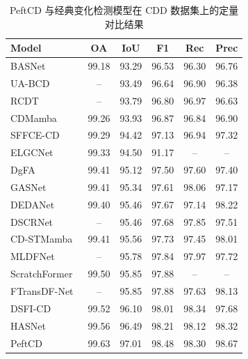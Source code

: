 \begin{table}[!htbp]
\centering
\caption{PeftCD 与经典变化检测模型在 CDD 数据集上的定量对比结果}
\label{tab:peftcd_cdd}
\begin{tabular}{l c c c c c}
\toprule
\textbf{Model} & \textbf{OA} & \textbf{IoU} & \textbf{F1} & \textbf{Rec} & \textbf{Prec} \\
\midrule
BASNet~\cite{z_wang_bitemporal_2024} & 99.18 & 93.29 & 96.53 & 96.30 & 96.76 \\  
UA-BCD~\cite{li_overcoming_2025}     & --    & 93.49 & 96.64 & 96.90 & 96.38 \\
RCDT~\cite{lu_cross_2024}                  & --    & 93.79 & 96.80 & 96.97 & 96.63 \\
CDMamba~\cite{zhang_cdmamba_2025}    & 99.26 & 93.93 & 96.87 & 96.84 & 96.90 \\
SFFCE-CD~\cite{y_xing_sffce-cd_2025}   & 99.29 & 94.42 & 97.13 & 96.94 &  97.32 \\
ELGCNet~\cite{m_noman_elgc-net_2024}   & 99.33  &  94.50   & 91.17  & --   & -- \\   
DgFA~\cite{f_zhou_dual-granularity_2025} & 99.41 & 95.12 & 97.50 & 97.60 & 97.40 \\
GASNet~\cite{zhang_global-aware_2023}  & 99.41  & 95.34  & 97.61  & 98.06  & 97.17 \\
DEDANet~\cite{Li2025DifferenceEA} & 99.40 & 95.46 & 97.67 & 97.14 & 98.22 \\
DSCRNet ~\cite{Zhang2025ADS} & -- & 95.46 & 97.68 & 97.85 & 97.51 \\
CD-STMamba~\cite{Liu2025CDSTMambaTR} & 99.41 & 95.56 & 97.73 & 97.45 & 98.01 \\
MLDFNet~\cite{d_sidekejiang_mldfnet_2025}  & -- & 95.78 & 97.84 & 97.97 & 97.72 \\
ScratchFormer~\cite{Noman2023RemoteSC}   & 99.50 & 95.85  & 97.88 & -- & -- \\ 
FTransDF-Net~\cite{li_dual_2025}   & -- & 95.85 &  97.88 & 97.63 & 98.13 \\
DSFI-CD~\cite{x_li_dsfi-cd_2025}  & 99.52 & 96.10 &  98.01 & 98.34 & 97.68 \\
HASNet~\cite{c_tao_hasnet_2025}        & 99.56 & 96.49 & 98.21 & 98.12 & 98.32 \\
\midrule
PeftCD & 99.63 & 97.01 & 98.48 & 98.30 & 98.67 \\
\bottomrule
\end{tabular}
\end{table}

